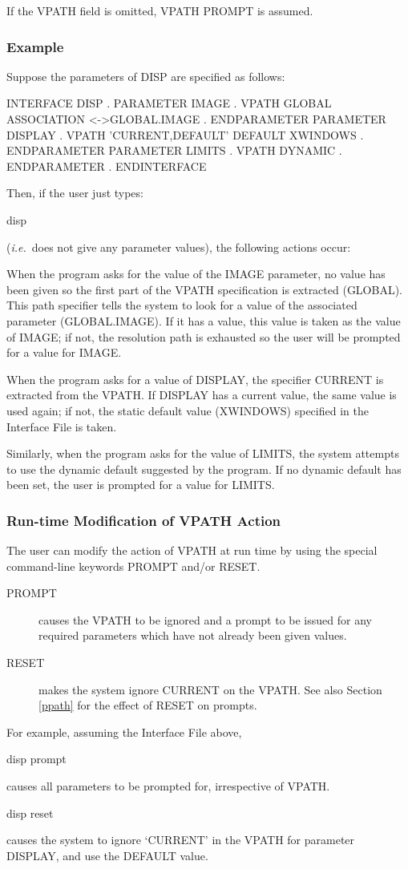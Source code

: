 \documentclass[twoside,11pt,nolof]{starlink}
\begin{document}
If the VPATH field is omitted, VPATH PROMPT is assumed.

\subsubsection*{Example}
Suppose the parameters of DISP are specified as follows:
\begin{terminalv}
INTERFACE DISP
   .
   PARAMETER IMAGE
         .
      VPATH GLOBAL
      ASSOCIATION <->GLOBAL.IMAGE
         .
   ENDPARAMETER
   PARAMETER DISPLAY
         .
      VPATH 'CURRENT,DEFAULT'
      DEFAULT XWINDOWS
         .
   ENDPARAMETER
   PARAMETER LIMITS
         .
      VPATH DYNAMIC
         .
   ENDPARAMETER
      .
ENDINTERFACE
\end{terminalv}
Then, if the user just types:
\begin{terminalv}
disp
\end{terminalv}
(\emph{i.e.}\ does not give any parameter values), the following actions occur:

When the program asks for the value of the IMAGE parameter, no value has
been given so the first part of the VPATH specification is extracted (GLOBAL).
This path specifier tells the system to look for a value of the associated
parameter (GLOBAL.IMAGE).
If it has a value, this value is taken as the value of IMAGE;
if not, the resolution path is exhausted so the user will be prompted for a
value for IMAGE.

When the program asks for a value of DISPLAY, the specifier CURRENT
is extracted from the VPATH.
If DISPLAY has a current value, the same value is used again; if not, the
static default value (XWINDOWS) specified in the Interface File is taken.

Similarly, when the program asks for the value of LIMITS, the system
attempts to use the dynamic default suggested by the program. If no
dynamic default has been set, the user is prompted for a value for LIMITS.

\subsubsection*{Run-time Modification of VPATH Action}
The user can modify the action of VPATH at run time by using
the special command-line keywords PROMPT and/or RESET.
\begin{description}
\item[PROMPT] causes the VPATH to be ignored and a prompt to be issued
for any required parameters which have not already been given values.
\item[RESET] makes the system ignore CURRENT on the VPATH.
See also Section \ref{ppath} for the effect of RESET on prompts.
\end{description}
For example, assuming the Interface File above,
\begin{terminalv}
disp prompt
\end{terminalv}
causes all parameters to be prompted for, irrespective of VPATH.
\begin{terminalv}
disp reset
\end{terminalv}
causes the system to ignore `CURRENT' in the VPATH for parameter DISPLAY,
and use the DEFAULT value.
\end{document}
